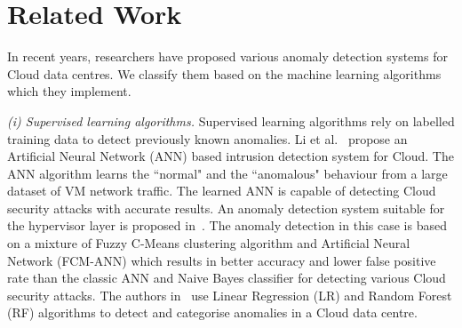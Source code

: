 \section{Related Work}
\label{sec:related_work}
\noindent In recent years, researchers have proposed various anomaly detection systems for Cloud data centres. We classify them based on the machine learning algorithms which they implement.

\textit{(i) Supervised learning algorithms.}
Supervised learning algorithms rely on labelled training data to detect previously known anomalies. 
Li et al.~\cite{ml_based:2012} propose an Artificial Neural Network (ANN) based intrusion detection system for Cloud. The ANN algorithm learns the ``normal" and the ``anomalous" behaviour from a large dataset of VM network traffic. The learned ANN is capable of detecting Cloud security attacks with accurate results.
An anomaly detection system suitable for the hypervisor layer is proposed in~\cite{Pandeeswari2016}. The anomaly detection in this case is based on a mixture of Fuzzy C-Means clustering algorithm and Artificial Neural Network (FCM-ANN) which results in better accuracy and lower false positive rate than the classic ANN and Naive Bayes classifier for detecting various Cloud security attacks. 
The authors in~\cite{supervised_ml:2017} use Linear Regression (LR) and Random Forest (RF) algorithms to detect and categorise anomalies in a Cloud data centre. 
